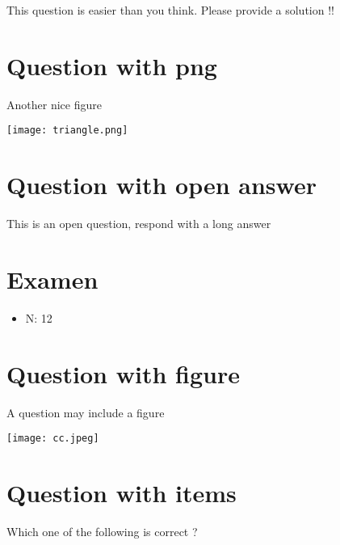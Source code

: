 \documentclass[a4paper,11pt,twoside]{article}
\begin{document}
This question is easier than you think. Please provide a solution !!



\section*{Question with png}
\label{sec:org763bb6c}

Another nice figure

\begin{center}
\texttt{[image: triangle.png]}
\end{center}



\section*{Question with open answer}
\label{sec:orgbfff62b}

This is an open question, respond with a long answer


\subsection*{}
\label{sec:org6a6d624}

\cleardoublepage

\section*{Examen}
\label{sec:orgcf5cb67}
\begin{itemize}
\item N: 12
\end{itemize}
\section*{Question with figure}
\label{sec:org8b8d130}


A question may include a figure

\begin{center}
\texttt{[image: cc.jpeg]}
\end{center}



\section*{Question with items}
\label{sec:org9fe068f}

Which one of the following is correct ?
\end{document}

